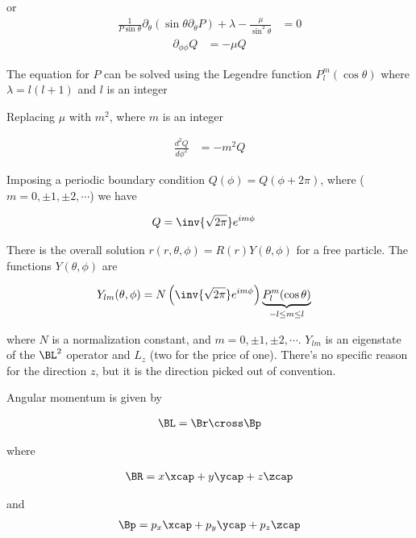 or
\begin{align}\label{eqn:PHY356F:1000}
\frac{1}{P \sin\theta} \partial_\theta (\sin\theta \partial_\theta P) +\lambda -\frac{\mu}{\sin^2\theta} &= 0
\end{align}
\begin{align}\label{eqn:PHY356F:2000}
\partial_{\phi\phi} Q &= -\mu Q
\end{align}

The equation for $P$ can be solved using the Legendre function $P_l^m(\cos\theta)$ where $\lambda = l(l+1)$ and $l$ is an integer

Replacing $\mu$ with $m^2$, where $m$ is an integer

\begin{align*}
\frac{d^2 Q}{d\phi^2} &= -m^2 Q
\end{align*}

Imposing a periodic boundary condition $Q(\phi) = Q(\phi + 2\pi)$, where ($m = 0, \pm 1, \pm 2, \cdots$) we have

\begin{align*}
Q &= \inv{\sqrt{2\pi}} e^{im\phi}
\end{align*}

There is the overall solution $r(r,\theta,\phi) = R(r) Y(\theta, \phi)$ for a free particle.  The functions $Y(\theta, \phi)$ are

\begin{align*}
Y_{lm}(\theta, \phi)
&= N \left( \inv{\sqrt{2\pi}} e^{im\phi} \right) \underbrace{ P_l^m(\cos\theta) }_{ -l \le m \le l }
\end{align*}

where $N$ is a normalization constant, and $m = 0, \pm 1, \pm 2, \cdots$.  $Y_{lm}$ is an eigenstate of the $\BL^2$ operator and $L_z$ (two for the price of one).  There's no specific reason for the direction $z$, but it is the direction picked out of convention.

Angular momentum is given by

\begin{align*}
\BL = \Br \cross \Bp
\end{align*}

where

\begin{align*}
\BR = x \xcap + y\ycap + z\zcap
\end{align*}

and
\begin{align*}
\Bp = p_x \xcap + p_y\ycap + p_z\zcap
\end{align*}

